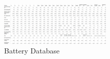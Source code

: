 \begin{figure}[H]
    \centering
    \includegraphics[angle=90, width=0.47\textwidth]{Figures/celldatapic.png}
    \captionsetup{justification=centering}
    \caption{Battery Database}
    \label{fig:celldatabase}
\end{figure}

